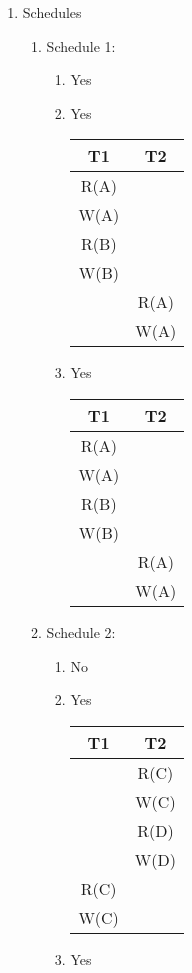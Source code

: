 \documentclass{report}
\begin{document}
\begin{enumerate}
		\item Schedules
		\begin{enumerate}
			\item Schedule 1:
			\begin{enumerate}
				\item Yes
				\item Yes \\
				\begin{tabular}{c c} \\
				T1 & T2 \\
				\hline 
				R(A) & \\
				W(A) & \\ 
				R(B) & \\ 
				W(B) & \\
 					 & R(A) \\
 					 & W(A)
				\end{tabular}
				\item Yes \\
				\begin{tabular}{c c} \\
				T1 & T2 \\
				\hline 
				R(A) & \\
				W(A) & \\ 
				R(B) & \\ 
				W(B) & \\
 					 & R(A) \\
 					 & W(A)
				\end{tabular}
			\end{enumerate}
			\item Schedule 2:
			\begin{enumerate}
				\item No
				\item Yes\\
				\begin{tabular}{c c} \\
				T1 & T2 \\
				\hline 
				& R(C) \\
				& W(C) \\
				& R(D) \\ 
				& W(D)\\ 
				R(C) & \\ 
				W(C) & \\
				\end{tabular}
				\item Yes \\
				\begin{tabular}{c c} \\

\end{tabular}
\end{enumerate}
\end{enumerate}
\end{enumerate}
\end{document}

